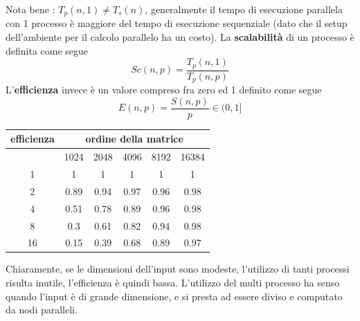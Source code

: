 \documentclass[10pt, letterpaper]{report}
\begin{document}
Nota bene : $T_p(n,1)\ne T_s(n)$, generalmente il tempo di esecuzione parallela con 1 processo è maggiore del tempo 
di esecuzione sequenziale (dato che il setup dell'ambiente per il calcolo parallelo ha un costo).\acc 
La \textbf{scalabilità} di un processo è definita come segue 
$$ Sc(n,p)=\frac{T_p(n,1)}{T_p(n,p)}$$
L'\textbf{efficienza} invece è un valore compreso fra zero ed 1 definito come segue 
$$ E(n,p)=\frac{S(n,p)}{p}\in(0,1]$$\begin{center}
    \begin{tabular}{c|ccccc|}
        \cline{2-6}
        efficienza                                                    & \multicolumn{5}{c|}{\cellcolor[HTML]{ECF4FF}ordine della matrice}                                                                                                                                                     \\ \hline
        \rowcolor[HTML]{ECF4FF} 
        \multicolumn{1}{|c|}{\cellcolor[HTML]{FFFFC7}numero processi} & \multicolumn{1}{c|}{\cellcolor[HTML]{ECF4FF}1024} & \multicolumn{1}{c|}{\cellcolor[HTML]{ECF4FF}2048} & \multicolumn{1}{c|}{\cellcolor[HTML]{ECF4FF}4096} & \multicolumn{1}{c|}{\cellcolor[HTML]{ECF4FF}8192} & 16384 \\ \hline
        \multicolumn{1}{|c|}{\cellcolor[HTML]{FFFFC7}1}               & \multicolumn{1}{c|}{1}                            & \multicolumn{1}{c|}{1}                            & \multicolumn{1}{c|}{1}                            & \multicolumn{1}{c|}{1}                            & 1     \\ \hline
        \multicolumn{1}{|c|}{\cellcolor[HTML]{FFFFC7}2}               & \multicolumn{1}{c|}{0.89}                         & \multicolumn{1}{c|}{0.94}                         & \multicolumn{1}{c|}{0.97}                         & \multicolumn{1}{c|}{0.96}                         & 0.98  \\ \hline
        \multicolumn{1}{|c|}{\cellcolor[HTML]{FFFFC7}4}               & \multicolumn{1}{c|}{0.51}                         & \multicolumn{1}{c|}{0.78}                         & \multicolumn{1}{c|}{0.89}                         & \multicolumn{1}{c|}{0.96}                         & 0.98  \\ \hline
        \multicolumn{1}{|c|}{\cellcolor[HTML]{FFFFC7}8}               & \multicolumn{1}{c|}{0.3}                          & \multicolumn{1}{c|}{0.61}                         & \multicolumn{1}{c|}{0.82}                         & \multicolumn{1}{c|}{0.94}                         & 0.98  \\ \hline
        \multicolumn{1}{|c|}{\cellcolor[HTML]{FFFFC7}16}              & \multicolumn{1}{c|}{0.15}                         & \multicolumn{1}{c|}{0.39}                         & \multicolumn{1}{c|}{0.68}                         & \multicolumn{1}{c|}{0.89}                         & 0.97  \\ \hline
        \end{tabular}
\end{center}
Chiaramente, se le dimensioni dell'input sono modeste, l'utilizzo di tanti processi risulta inutile, 
l'efficienza è quindi bassa. L'utilizzo del multi processo ha senso quando l'input è di grande dimensione, 
e si presta ad essere diviso e computato da nodi paralleli.
\end{document}

